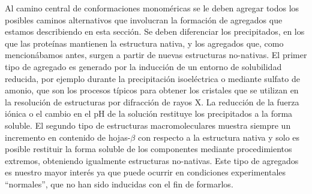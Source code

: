 % 



Al camino central de conformaciones monoméricas se le deben agregar todos los posibles caminos alternativos que involucran la formación de agregados que estamos describiendo en esta sección.
Se deben diferenciar los precipitados, en los que las proteínas mantienen la estructura nativa, y los agregados que, como mencionábamos antes, surgen a partir de nuevas estructuras no-nativas.
El primer tipo de agregado es generado por la inducción de un entorno de solubilidad reducida, por ejemplo durante la precipitación isoeléctrica o mediante sulfato de amonio,
que son los procesos típicos para obtener los cristales que se utilizan en la resolución de estructuras por difracción de rayos X. 
La reducción de la fuerza iónica o el cambio en el pH de la solución restituye los precipitados a la forma soluble.
El segundo tipo de estructuras macromoleculares muestra siempre un incremento en contenido de hojas-$\beta$ con respecto a la estructura nativa y solo es posible restituir 
la forma soluble de los componentes mediante procedimientos extremos, obteniendo igualmente estructuras no-nativas.
Este tipo de agregados es nuestro mayor interés ya que puede ocurrir en condiciones experimentales ``normales'', que no han sido inducidas con el fin de formarlos.



